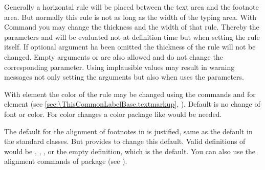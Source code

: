 \begin{Declaration}
\end{Declaration}%
Generally%
a horizontal rule will be placed between the text area and the footnote
area. But normally this rule is not as long as the width of the typing
area. With Command  you may change the thickness and
the width of that rule. Thereby the parameters  and
 will be evaluated not at definition time but when setting the
rule itself. If optional argument  ha been omitted the
thickness of the rule will not be changed. Empty arguments 
or  are also allowed and do not change the corresponding
parameter. Using implausible values may result in warning messages not only
setting the arguments but also when \KOMAScript{} uses the parameters.

\BeginIndexGroup
{}%
With element 
the color%
of the rule may be changed using the commands
 and
 for element
 (see \autoref{sec:\ThisCommonLabelBase.textmarkup},
). Default is no change of
font or color. For color changes a color package like
 would be
needed.%
\EndIndexGroup
\EndIndexGroup

\begin{Declaration}
\end{Declaration}
The default%
for the alignment of footnotes in \KOMAScript{} is justified, same as the
default in the standard classes. But \KOMAScript{} provides
 to change this default. Valid definitions of
 would be ,
,
,  or the
empty definition, which is the default. You can also use the alignment
commands of package  (see
\cite{package:ragged2e}).


